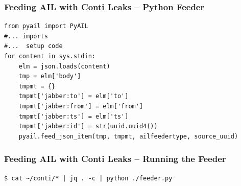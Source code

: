\documentclass[10pt,aspectratio=169, colorlinks=true, linkcolor=circlBlue]{beamer}
\begin{document}
\begin{frame}[fragile]
    \frametitle{Feeding AIL with Conti Leaks – Python Feeder}

    \begin{tcolorbox}[colback=black!85, coltext=green, title=feeder.py, fonttitle=\bfseries, arc=2mm, boxrule=0.4pt]
\begin{verbatim}
from pyail import PyAIL
#... imports
#...  setup code
for content in sys.stdin:
    elm = json.loads(content)
    tmp = elm['body']
    tmpmt = {}
    tmpmt['jabber:to'] = elm['to']
    tmpmt['jabber:from'] = elm['from']
    tmpmt['jabber:ts'] = elm['ts']
    tmpmt['jabber:id'] = str(uuid.uuid4())
    pyail.feed_json_item(tmp, tmpmt, ailfeedertype, source_uuid)
\end{verbatim}
    \end{tcolorbox}

\end{frame}


\begin{frame}[fragile]
    \frametitle{Feeding AIL with Conti Leaks – Running the Feeder}

    \begin{tcolorbox}[colback=black!85, coltext=green, title=Run the feeder with Conti leaks, fonttitle=\bfseries, arc=2mm, boxrule=0.4pt]
\begin{verbatim}
$ cat ~/conti/* | jq . -c | python ./feeder.py
\end{verbatim}
    \end{tcolorbox}

\end{frame}
\end{document}
